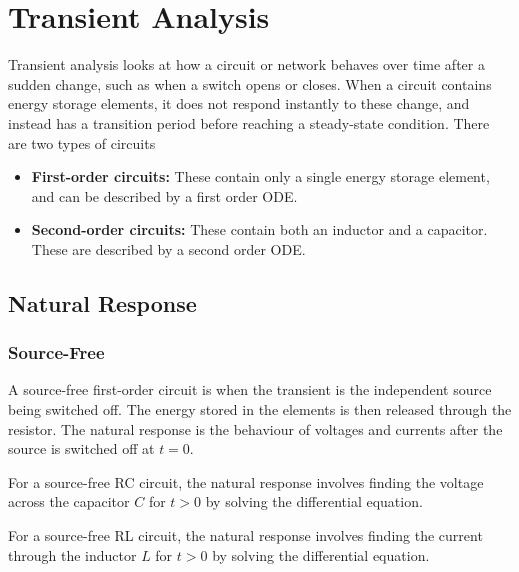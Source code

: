 \documentclass{article}
\begin{document}
\section{Transient Analysis}
Transient analysis looks at how a circuit or network behaves over time after a sudden change, such as when a switch opens or closes. When a circuit contains energy storage elements, it does not respond instantly to these change, and instead has a transition period before reaching a steady-state condition. There are two types of circuits
\begin{itemize}
    \item \textbf{First-order circuits:} These contain only a single energy storage element, and can be described by a first order ODE.
    \item \textbf{Second-order circuits:} These contain both an inductor and a capacitor. These are described by a second order ODE.
\end{itemize}

\subsection{Natural Response}
\subsubsection{Source-Free}
A source-free first-order circuit is when the transient is the independent source being switched off. The energy stored in the elements is then released through the resistor. The natural response is the behaviour of voltages and currents after the source is switched off at $t=0$.

For a source-free RC circuit, the natural response involves finding the voltage across the capacitor $C$ for $t>0$ by solving the differential equation.

For a source-free RL circuit, the natural response involves finding the current through the inductor $L$ for $t>0$ by solving the differential equation.
\end{document}

